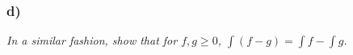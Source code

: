 \documentclass[12pt]{article}
\theoremstyle{plain}
\begin{document}


\subsubsection*{ d)}
\emph{In a similar fashion, show that for $f, g \geq 0$, $\int(f - g) = \int f - \int g$.}
\end{document}

